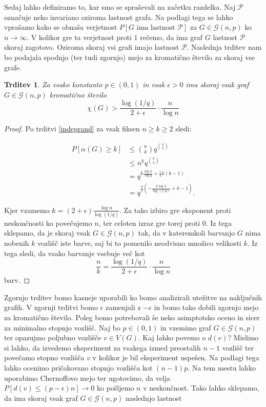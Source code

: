 \documentclass[12pt,a4paper,twoside]{article}
\theoremstyle{definition} %
\theoremstyle{plain} %
\newtheorem{trditev}[definicija]{Trditev}
\numberwithin{equation}{section}  %
\begin{document}
Sedaj lahko definiramo to, kar smo se spraševali na začetku razdelka. Naj $\mathcal{P}$ označuje neko invariano oziroma lastnost grafa. Na podlagi tega se lahko vprašamo kako se obnaša verjetnost $P[G \text{ ima lastnost } \mathcal{P}]$ za $G \in \mathcal{G}(n, p)$ ko $n \rightarrow \infty$. V kolikor gre ta verjetnost proti $1$ rečemo, da ima graf $G$ lastnost $\mathcal{P}$ skoraj zagotovo. Oziroma skoraj vsi grafi imajo lastnost $\mathcal{P}$. Naslednja trditev nam bo podajala spodnjo (ter tudi zgornjo) mejo za kromatično število za skoraj vse grafe.
\begin{trditev}
Za vsako konstanto $p \in (0,1)$ in vsak $\epsilon > 0$ ima skoraj vsak graf $G \in \mathcal{G}(n, p)$ kromatično število
$$ \chi(G) > \frac{\log(1/q)}{2 + \epsilon} \cdot \frac{n}{\log n} $$
\end{trditev}
\begin{proof}
Po trditvi \ref{indeprand} za vsak fiksen $n \ge k \ge 2$ sledi:

\begin{equation}
\begin{split}
P[\alpha(G) \ge k]  &\le {n \choose k} q ^{k \choose 2} \\
& \le n^k q ^{k \choose 2} \\
&= q^{k \frac{\log n}{\log q} + \frac{1}{2}k(k-1)} \\
&= q^{\frac{k}{2}\left(- \frac{2 \log n}{\log(1/q)} + k - 1\right)}.
\end{split}
\end{equation}

Kjer vzamemo $k = (2 + \epsilon) \frac{\log n}{\log (1/q)}$. Za tako izbiro gre eksponent proti neskončnosti ko povečujemo $n$, ter celoten izraz gre torej proti $0$. Iz tega sklepamo, da je skoraj vsak $G \in \mathcal{G}(n, p)$ tak, da v kateremkoli barvanjo $G$ nima nobenih $k$ vozlišč iste barve, saj bi to pomenilo neodvisno množico velikosti $k$. Iz tega sledi, da vsako barvanje vsebuje več kot 
$$ \frac{n}{k} = \frac{\log (1/q)}{2 + \epsilon} \cdot \frac{n}{\log n} $$
barv.
\end{proof}

Zgornjo trditev bomo kasneje uporabili ko bomo analizirali utežitve na naključnih grafih. V zgornji trditvi bomo $\epsilon$ zamenjali z $-\epsilon$ in bomo tako dobili zgornjo mejo za kromatično število. Poleg bomo potrebovali še neko asimptotsko oceno in sicer za minimalno stopnjo vozlišč. Naj bo $p \in (0, 1)$ in vzemimo graf $G \in  \mathcal{G}(n, p)$ ter opazujmo poljubno vozlišče $v \in V(G)$. Kaj lahko povemo o $d(v)$? Mislimo si lahko, da izvedemo eksperiment za vsakega izmed preostalih $n - 1$ vozlišč ter povečamo stopno vozlišča $v$ v kolikor je bil eksperiment uspešen. Na podlagi tega lahko ocenimo pričakovano stopnjo vozlišča kot $(n-1)p$. Na tem mestu lahko uporabimo Chernoffovo mejo ter ugotovimo, da velja $P[d(v) \le (p - \epsilon)n] \rightarrow 0$ ko pošljemo $n$ v neskončnost. Tako lahko sklepamo, da ima skoraj vsak graf $G \in  \mathcal{G}(n, p)$ naslednjo lastnost
\end{document}
